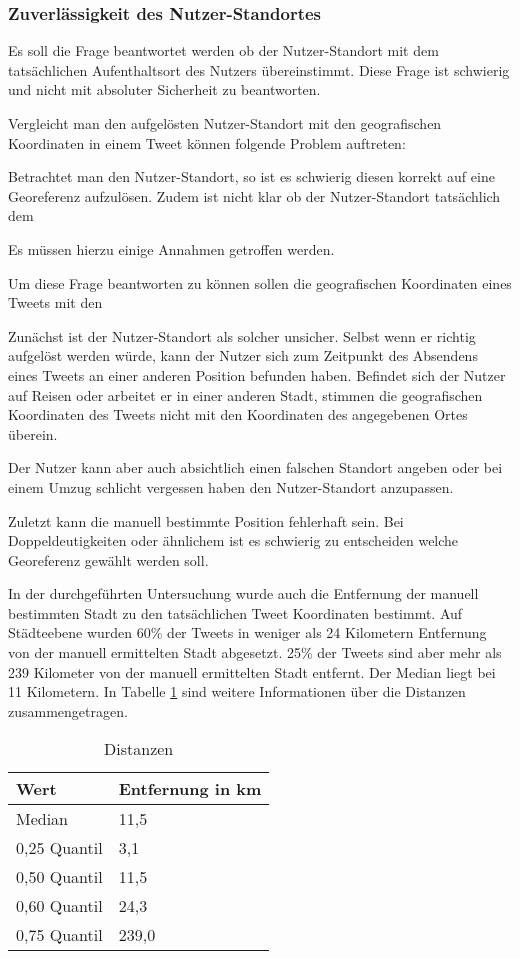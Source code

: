 \subsubsection{Zuverlässigkeit des Nutzer-Standortes}

				Es soll die Frage beantwortet werden ob der Nutzer-Standort mit dem tatsächlichen Aufenthaltsort des Nutzers übereinstimmt.
				Diese Frage ist schwierig und nicht mit absoluter Sicherheit zu beantworten.

				Vergleicht man den aufgelösten Nutzer-Standort mit den geografischen Koordinaten in einem Tweet können folgende Problem auftreten:

				Betrachtet man den Nutzer-Standort, so ist es schwierig diesen korrekt auf eine Georeferenz aufzulösen. 
				Zudem ist nicht klar ob der Nutzer-Standort tatsächlich dem

				Es müssen hierzu einige Annahmen getroffen werden.


				Um diese Frage beantworten zu können sollen die geografischen Koordinaten eines Tweets mit den 

				Zunächst ist der Nutzer-Standort als solcher unsicher. 
				Selbst wenn er richtig aufgelöst werden würde, kann der Nutzer sich zum Zeitpunkt des Absendens eines Tweets an einer anderen Position befunden haben.
				Befindet sich der Nutzer auf Reisen oder arbeitet er in einer anderen Stadt, stimmen die geografischen Koordinaten des Tweets nicht mit den Koordinaten des angegebenen Ortes überein.

				Der Nutzer kann aber auch absichtlich einen falschen Standort angeben oder bei einem Umzug schlicht vergessen haben den Nutzer-Standort anzupassen.

				Zuletzt kann die manuell bestimmte Position fehlerhaft sein.
				Bei Doppeldeutigkeiten oder ähnlichem ist es schwierig zu entscheiden welche Georeferenz gewählt werden soll.

				In der durchgeführten Untersuchung wurde auch die Entfernung der manuell bestimmten Stadt zu den tatsächlichen Tweet Koordinaten bestimmt.
				Auf Städteebene wurden 60\% der Tweets in weniger als 24 Kilometern Entfernung von der manuell ermittelten Stadt abgesetzt.
				25\% der Tweets sind aber mehr als 239 Kilometer von der manuell ermittelten Stadt entfernt. 
				Der Median liegt bei 11 Kilometern.
				In Tabelle \ref{tab:distancesP} sind weitere Informationen über die Distanzen zusammengetragen.

				\begin{table}[h]
				\centering
				\caption{Distanzen}
				\label{tab:distancesP}
				\begin{tabular}{|l|l|}
				\hline
				Wert 		 & Entfernung in km \\ \hline \hline
				Median       & 11,5  \\ \hline
				0,25 Quantil & 3,1   \\ \hline
				0,50 Quantil & 11,5  \\ \hline
				0,60 Quantil & 24,3  \\ \hline
				0,75 Quantil & 239,0 \\ \hline
				\end{tabular}
				\end{table}


